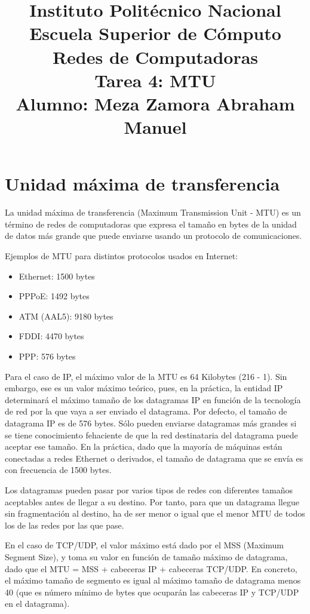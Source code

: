 \documentclass[a4paper,12pt]{article}
\begin{document}
\title{\Large Instituto Politécnico Nacional\\Escuela Superior de Cómputo\\Redes de Computadoras\\Tarea 4: MTU\\Alumno: Meza Zamora Abraham Manuel}
\date{}
\maketitle

\section{Unidad máxima de transferencia}
La unidad máxima de transferencia (Maximum Transmission Unit - MTU) es un término de redes de computadoras que expresa el tamaño en bytes de la unidad de datos más grande que puede enviarse usando un protocolo de comunicaciones.

Ejemplos de MTU para distintos protocolos usados en Internet:
\begin{itemize}
\item Ethernet: 1500 bytes
\item PPPoE: 1492 bytes
\item ATM (AAL5): 9180 bytes
\item FDDI: 4470 bytes
\item PPP: 576 bytes

\end{itemize}

Para el caso de IP, el máximo valor de la MTU es 64 Kilobytes (216 - 1). Sin embargo, ese es un valor máximo teórico, pues, en la práctica, la entidad IP determinará el máximo tamaño de los datagramas IP en función de la tecnología de red por la que vaya a ser enviado el datagrama. Por defecto, el tamaño de datagrama IP es de 576 bytes. Sólo pueden enviarse datagramas más grandes si se tiene conocimiento fehaciente de que la red destinataria del datagrama puede aceptar ese tamaño. En la práctica, dado que la mayoría de máquinas están conectadas a redes Ethernet o derivados, el tamaño de datagrama que se envía es con frecuencia de 1500 bytes.

Los datagramas pueden pasar por varios tipos de redes con diferentes tamaños aceptables antes de llegar a su destino. Por tanto, para que un datagrama llegue sin fragmentación al destino, ha de ser menor o igual que el menor MTU de todos los de las redes por las que pase.

En el caso de TCP/UDP, el valor máximo está dado por el MSS (Maximum Segment Size), y toma su valor en función de tamaño máximo de datagrama, dado que el MTU = MSS + cabeceras IP + cabeceras TCP/UDP. En concreto, el máximo tamaño de segmento es igual al máximo tamaño de datagrama menos 40 (que es número mínimo de bytes que ocuparán las cabeceras IP y TCP/UDP en el datagrama).
\end{document}

